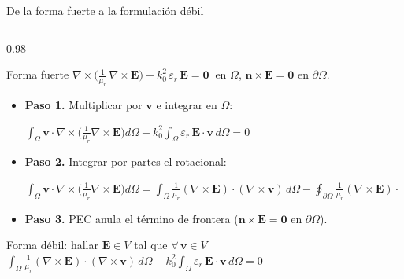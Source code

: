 \documentclass{beamer}
\begin{document}
\begin{frame}[fragile]{De la forma fuerte a la formulación débil}
  \vspace{-0.40cm}
  \setlength{\abovedisplayskip}{2pt}
  \setlength{\belowdisplayskip}{2pt}
  \setlength{\jot}{0.5pt}
  \begin{columns}[t]
  \begin{column}{0.98\textwidth}
    \scriptsize
    \begin{block}{Forma fuerte}
      \centering
      $\displaystyle
        \nabla\times\!\Big(\tfrac{1}{\mu_r}\,\nabla\times\mathbf{E}\Big)
        - k_0^2\,\varepsilon_r\,\mathbf{E} = \mathbf{0}
        \ \text{ en } \Omega$,
      \quad
      $\mathbf{n}\times\mathbf{E} = \mathbf{0}$ en $\partial\Omega$.
    \end{block}
    \vspace{0.10cm}
    \begin{itemize}\setlength\itemsep{3pt}
      \item \textbf{Paso 1.} Multiplicar por $\mathbf{v}$ e integrar en $\Omega$:
        \begin{center}
        $\displaystyle
          \int_\Omega \mathbf{v}\cdot\nabla\times\!\Big(\tfrac{1}{\mu_r}\nabla\times\mathbf{E}\Big)d\Omega
          - k_0^2\!\int_\Omega \varepsilon_r\,\mathbf{E}\cdot\mathbf{v}\,d\Omega = 0$
        \end{center}
      \item \textbf{Paso 2.} Integrar por partes el rotacional:
        \begin{center}
        $\displaystyle
          \int_\Omega \mathbf{v}\cdot\nabla\times\!\Big(\tfrac{1}{\mu_r}\nabla\times\mathbf{E}\Big)d\Omega
          = \int_\Omega \tfrac{1}{\mu_r}(\nabla\times\mathbf{E})\cdot(\nabla\times\mathbf{v})\,d\Omega
          - \oint_{\partial\Omega}\tfrac{1}{\mu_r}(\nabla\times\mathbf{E})\cdot(\mathbf{n}\times\mathbf{v})\,dS$
        \end{center}
      \item \textbf{Paso 3.} PEC anula el término de frontera
        ($\mathbf{n}\times\mathbf{E} = \mathbf{0}$ en $\partial\Omega$).
    \end{itemize}
    \vspace{0.10cm}
    \begin{block}{Forma débil: hallar $\mathbf{E}\in V$ tal que $\forall\,\mathbf{v}\in V$}
      \centering
      $\displaystyle
        \int_\Omega \tfrac{1}{\mu_r}(\nabla\times\mathbf{E})\cdot(\nabla\times\mathbf{v})\,d\Omega
        - k_0^2\!\int_\Omega \varepsilon_r\,\mathbf{E}\cdot\mathbf{v}\,d\Omega = 0$
    \end{block}
  \end{column}
  \end{columns}
\end{frame}
\end{document}
